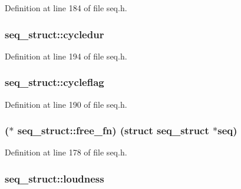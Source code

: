 Definition at line 184 of file seq.\+h.

\subsubsection[{\texorpdfstring{cycledur}{cycledur}}]{ seq\+\_\+struct\+::cycledur}\hypertarget{structseq__struct_aeda468ff836bb192f1469f00a790ada9}{}\label{structseq__struct_aeda468ff836bb192f1469f00a790ada9}


Definition at line 194 of file seq.\+h.

\subsubsection[{\texorpdfstring{cycleflag}{cycleflag}}]{ seq\+\_\+struct\+::cycleflag}\hypertarget{structseq__struct_a49b344dfbe641895a1604dd578fa1f67}{}\label{structseq__struct_a49b344dfbe641895a1604dd578fa1f67}


Definition at line 190 of file seq.\+h.

\subsubsection[{\texorpdfstring{free\+\_\+fn}{free_fn}}]{($\ast$ seq\+\_\+struct\+::free\+\_\+fn) (struct {\bf seq\+\_\+struct} $\ast$seq)}\hypertarget{structseq__struct_a5bcda4c9c9d57e541017b2d71b8e3f76}{}\label{structseq__struct_a5bcda4c9c9d57e541017b2d71b8e3f76}


Definition at line 178 of file seq.\+h.

\subsubsection[{\texorpdfstring{loudness}{loudness}}]{ seq\+\_\+struct\+::loudness}\hypertarget{structseq__struct_aa58d76e946e0cd53fab79ce5e3f10a9f}{}\label{structseq__struct_aa58d76e946e0cd53fab79ce5e3f10a9f}


